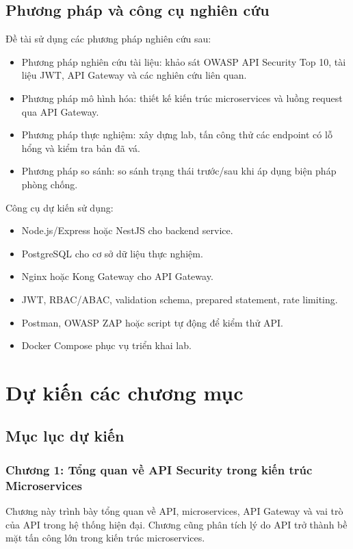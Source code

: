 \documentclass[14pt,a4paper]{extarticle}
\begin{document}
\subsection{Phương pháp và công cụ nghiên cứu}
Đề tài sử dụng các phương pháp nghiên cứu sau:
\begin{itemize}
  \item Phương pháp nghiên cứu tài liệu: khảo sát OWASP API Security Top 10, tài liệu JWT, API Gateway và các nghiên cứu liên quan.
  \item Phương pháp mô hình hóa: thiết kế kiến trúc microservices và luồng request qua API Gateway.
  \item Phương pháp thực nghiệm: xây dựng lab, tấn công thử các endpoint có lỗ hổng và kiểm tra bản đã vá.
  \item Phương pháp so sánh: so sánh trạng thái trước/sau khi áp dụng biện pháp phòng chống.
\end{itemize}

Công cụ dự kiến sử dụng:
\begin{itemize}
  \item Node.js/Express hoặc NestJS cho backend service.
  \item PostgreSQL cho cơ sở dữ liệu thực nghiệm.
  \item Nginx hoặc Kong Gateway cho API Gateway.
  \item JWT, RBAC/ABAC, validation schema, prepared statement, rate limiting.
  \item Postman, OWASP ZAP hoặc script tự động để kiểm thử API.
  \item Docker Compose phục vụ triển khai lab.
\end{itemize}

\section{Dự kiến các chương mục}

\subsection*{Mục lục dự kiến}

\subsubsection*{Chương 1: Tổng quan về API Security trong kiến trúc Microservices}
Chương này trình bày tổng quan về API, microservices, API Gateway và vai trò của API trong hệ thống hiện đại. Chương cũng phân tích lý do API trở thành bề mặt tấn công lớn trong kiến trúc microservices.
\end{document}
